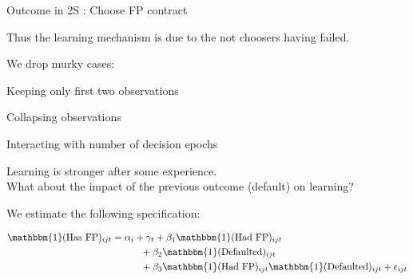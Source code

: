 \documentclass[oneside,11pt]{article}
\begin{document}
\begin{table}[H]
\caption{Outcome in 2S : Choose FP contract}
\label{iv_pf}
\begin{center}
\scriptsize{}
\end{center}
 \scriptsize

\end{table}

Thus the learning mechanism is due to the not choosers having failed. 


We drop murky cases:


\begin{table}[H]
\caption{Keeping only first two observations}
\begin{center}
\scriptsize{}
\end{center}
 \scriptsize

\end{table}


\begin{table}[H]
\caption{Collapsing observations}
\begin{center}
\scriptsize{}
\end{center}
 \scriptsize

\end{table}



\begin{table}[H]
\caption{Interacting with number of decision epochs}
\begin{center}
\scriptsize{}
\end{center}
 \scriptsize

\end{table}
Learning is stronger after some experience.\\

What about the impact of the previous outcome (default) on learning?

We estimate the following specification:



\begin{align*}
    \mathbbm{1}(\text{Has FP})_{ijt} &= \alpha_i + \gamma_t + \beta_1\mathbbm{1}(\text{Had FP})_{ijt} \\
    & \qquad \quad + \beta_2\mathbbm{1}(\text{Defaulted})_{ijt} \\
    & \qquad \quad  + \beta_3\mathbbm{1}(\text{Had FP})_{ijt}\mathbbm{1}(\text{Defaulted})_{ijt}   + \epsilon_{ijt}
\end{align*}
\end{document}
